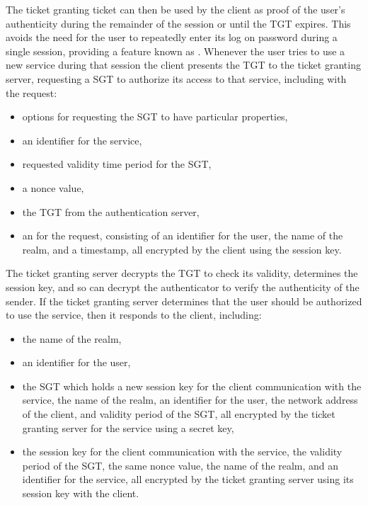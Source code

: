 The ticket granting ticket can then be used by the client as proof of the user's
authenticity during the remainder of the session or until the TGT expires.
This avoids the need for the user to repeatedly enter its log on password during
a single session, providing a feature known as .
Whenever the user tries to use a new service during that session the client
presents the TGT to the ticket granting server, requesting a SGT to authorize
its access to that service, including with the request:
\begin{itemize}
  \item options for requesting the SGT to have particular properties,
  \item an identifier for the service,
  \item requested validity time period for the SGT,
  \item a nonce value,
  \item the TGT from the authentication server,
  \item an  for the request, consisting of an identifier
  for the user, the name of the realm, and a timestamp, all encrypted by the
  client using the session key.
\end{itemize}
The ticket granting server decrypts the TGT to check its validity,
determines the session key, and so can decrypt the authenticator to verify the authenticity
of the sender. If the ticket granting server determines that the user should
be authorized to use the service, then it responds to the client, including:
\begin{itemize}
  \item the name of the realm,
  \item an identifier for the user,
  \item the SGT which holds a new session key for the client communication with the
  service, the name of the realm, an identifier for the user, the network
  address of the client, and validity period of the SGT, all encrypted
  by the ticket granting server for the service using a secret key,
  \item the session key for the client communication with the service,
  the validity period of the SGT, the same nonce value, the name of the realm,
  and an identifier for the service, all encrypted by the ticket granting server
  using its session key with the client.
\end{itemize}

